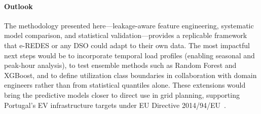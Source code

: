\documentclass[conference]{IEEEtran}
\begin{document}
\paragraph{Outlook}
The methodology presented here---leakage-aware feature engineering, systematic model comparison, and statistical validation---provides a replicable framework that e-REDES or any DSO could adapt to their own data. The most impactful next steps would be to incorporate temporal load profiles (enabling seasonal and peak-hour analysis), to test ensemble methods such as Random Forest and XGBoost, and to define utilization class boundaries in collaboration with domain engineers rather than from statistical quantiles alone. These extensions would bring the predictive models closer to direct use in grid planning, supporting Portugal's EV infrastructure targets under EU Directive 2014/94/EU~\cite{EUDIR2014}.
\end{document}
